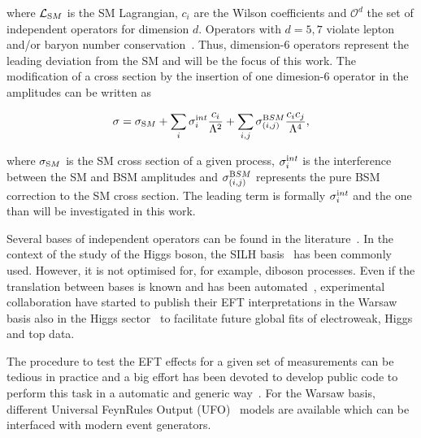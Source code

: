 where $\mathcal{L}_{\textrm SM}$ is the SM Lagrangian, $c_i$ are the Wilson coefficients and ${\mathcal{O}^{d}}$ the set of independent operators for dimension $d$. Operators with $d=5,7$  violate lepton and/or baryon number conservation~\cite{Degrande:2012wf,Kobach:2016ami}. Thus, dimension-6 operators represent the leading deviation from the SM and will be the focus of this work. The modification of a cross section by the insertion of one dimesion-6 operator in the amplitudes can be written as

\begin{equation}
\sigma = \sigma_{\textrm SM} + \sum_{i}\sigma_i^{\textrm int} \frac{c_i}{\Lambda^{2}} + \sum_{i,j}\sigma_{(i,j)}^{\textrm BSM} \frac{c_ic_j}{\Lambda^{4}},
\end{equation}  

where $\sigma_{\textrm SM}$ is the SM cross section of a given process, $\sigma_i^{\textrm int}$ is the interference between the SM and BSM amplitudes and $\sigma_{(i,j)}^{\textrm BSM}$ represents the pure BSM correction to the SM cross section. The leading term is formally $\sigma_i^{\textrm int}$ and the one than will be investigated in this work. 

Several bases of independent operators can be found in the literature~\cite{Grzadkowski:2010es,Contino:2013kra,Gupta:2014rxa,Masso:2014xra}. In the context of the study of the Higgs boson, the SILH basis~\cite{Contino:2013kra} has been commonly used. However, it is not optimised for, for example, diboson processes. Even if the translation between bases is known and has been automated~\cite{Falkowski:2015wza,Aebischer:2017ugx}, experimental collaboration have started to publish their EFT interpretations in the Warsaw basis also in the Higgs sector~\cite{ATLAS:2019jst,ATL-PHYS-PUB-2019-042} to facilitate future global fits of electroweak, Higgs and top data.

The procedure to test the EFT effects for a given set of measurements can be tedious in practice and a big effort has been devoted to develop public code to perform this task in a automatic and generic way~\cite{Brivio:2019irc}. For the Warsaw basis, different Universal FeynRules Output (UFO)~\cite{Degrande:2011ua} models are available which can be interfaced with modern event generators.


